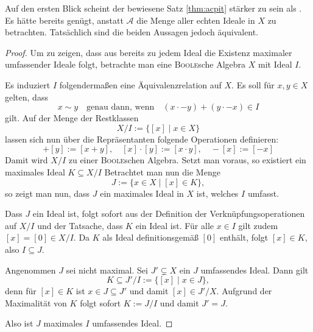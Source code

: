\begin{bem}
  Auf den ersten Blick scheint der bewiesene Satz \ref{thm:acpit} stärker zu sein als \PIT.
  Es hätte bereits genügt, anstatt $\mathcal{A}$ die Menge aller echten Ideale in $X$ zu betrachten.
  Tatsächlich sind die beiden Aussagen jedoch äquivalent.
\end{bem}

\begin{proof}
  
  Um zu zeigen, dass aus \PIT bereits zu jedem Ideal die Existenz maximaler umfassender Ideale folgt, betrachte man eine \textsc{Boole}sche Algebra $X$ mit Ideal $I$.
  
  Es induziert $I$ folgendermaßen eine Äquivalenzrelation auf $X$.
  Es soll für $x,y \in X$ gelten, dass 
  \begin{displaymath}
    x \sim y \quad \text{genau dann, wenn} \quad (x \cdot -y) + (y \cdot -x) \in I
  \end{displaymath}
  gilt.
  Auf der Menge der Restklassen 
  \begin{displaymath}
    X / I := \{[x] \mid x \in X\}
  \end{displaymath}
  lassen sich nun über die Repräsentanten folgende Operationen definieren:
  \begin{displaymath}
    [x] + [y] := [x+y], \quad
    [x] \cdot [y] := [x \cdot y], \quad
    -[x] := [-x]
  \end{displaymath}
  Damit wird $X/I$ zu einer \textsc{Boole}schen Algebra.
  Setzt man \PIT voraus, so existiert ein maximales Ideal $K \subseteq X/I$
  Betrachtet man nun die Menge
  \begin{displaymath}
    J := \{x \in X \mid [x] \in K\},
  \end{displaymath}
  so zeigt man nun, dass $J$ ein maximales Ideal in $X$ ist, welches $I$ umfasst.
  
  Dass $J$ ein Ideal ist, folgt sofort aus der Definition der Verknüpfungsoperationen auf $X/I$ und der Tatsache, dass $K$ ein Ideal ist.
  Für alle $x \in I$ gilt zudem $[x] = [0] \in X/I$. 
  Da $K$ als Ideal definitionsgemäß $[0]$ enthält, folgt $[x] \in K$, also $I \subseteq J$.
  
  Angenommen $J$ sei nicht maximal. Sei $J' \subsetneq X$ ein $J$ umfassendes Ideal.
  Dann gilt 
  \begin{displaymath}
    K \subseteq J'/I := \{[x] \mid x \in J\},
  \end{displaymath}
  denn für $[x] \in K$ ist $x \in J \subseteq J'$ und damit $[x] \in J'/X$.
  Aufgrund der Maximalität von $K$ folgt sofort $K := J/I$ und damit $J' = J$.

  Also ist $J$ maximales $I$ umfassendes Ideal.
\end{proof}

